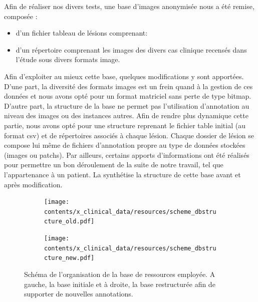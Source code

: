 Afin de réaliser nos divers tests, une base d'images anonymisée nous a été remise, composée :
\begin{itemize}
\item d'un fichier tableau de lésions comprenant:
    \item d'un répertoire comprenant les images des divers cas clinique recensés dans l'étude sous divers formats image.
\end{itemize}\par

Afin d'exploiter au mieux cette base, quelques modifications y sont apportées. D'une part, la diversité des formats images est un frein quand à la gestion de ces données et nous avons opté pour un format matriciel sans perte de type bitmap. D'autre part, la structure de la base ne permet pas l'utilisation d'annotation au niveau des images ou des instances autres. Afin de rendre plus dynamique cette partie, nous avons opté pour une structure reprenant le fichier table initial (au format \gls{csv}) et de répertoires associés à chaque lésion. Chaque dossier de lésion se compose lui même de fichiers d'annotation propre au type de données stockées (images ou patchs). Par ailleurs, certains apports d'informations ont été réalisés pour permettre un bon déroulement de la suite de notre travail, tel que l'appartenance à un patient. La  synthétise la structure de cette base avant et après modification.\par

\begin{figure}[H]
\centering
    \begin{subfigure}{.45\textwidth}
      \centering
      \texttt{[image: contents/x\_clinical\_data/resources/scheme\_dbstructure\_old.pdf]}
    \end{subfigure}
    \begin{subfigure}{.45\textwidth}
      \centering
      \texttt{[image: contents/x\_clinical\_data/resources/scheme\_dbstructure\_new.pdf]}
    \end{subfigure}
    \caption{Schéma de l'organisation de la base de ressources employée. A gauche, la base initiale et à droite, la base restructurée afin de supporter de nouvelles annotations.}
    \label{fig:db_structure}
\end{figure}\par